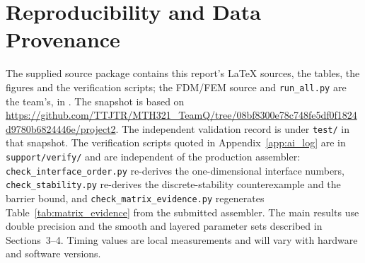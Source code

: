 \documentclass[11pt,a4paper]{article}
\theoremstyle{definition}
\theoremstyle{remark}
\begin{document}
\section{Reproducibility and Data Provenance}
\begin{sloppypar}
The supplied source package contains this report's \LaTeX{} sources, the
tables, the figures and the verification scripts; the FDM/FEM source and
\texttt{run\_all.py} are the team's, in . The snapshot is based on
\url{https://github.com/TTJTR/MTH321_TeamQ/tree/08bf8300e78c748fe5df0f1824d9780b6824446e/project2}.
The independent validation record is under \texttt{test/} in that snapshot. The
verification scripts quoted in Appendix~\ref{app:ai_log} are in
\texttt{support/verify/} and are independent of the production assembler:
\texttt{check\_interface\_order.py} re-derives the one-dimensional interface
numbers, \texttt{check\_stability.py} re-derives the discrete-stability
counterexample and the barrier bound, and \texttt{check\_matrix\_evidence.py}
regenerates Table~\ref{tab:matrix_evidence} from the submitted assembler.
The main results use double precision and the smooth and layered parameter
sets described in Sections~3--4. Timing values are local measurements and
will vary with hardware and software versions.
\end{sloppypar}
\end{document}

